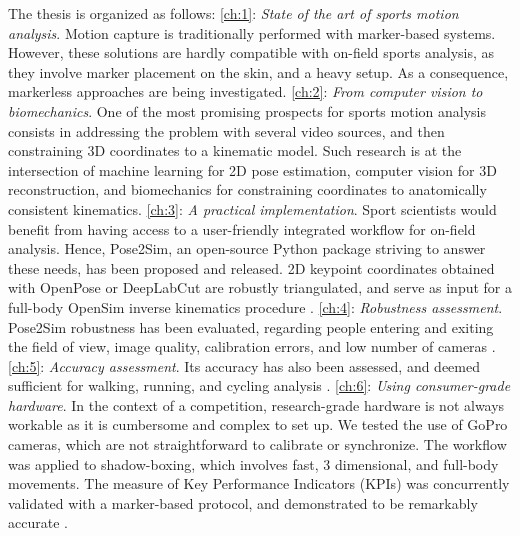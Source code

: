 The thesis is organized as follows:
\vskip 0.4cm
\noindent\autoref{ch:1}: \emph{State of the art of sports motion analysis}. \newline
Motion capture is traditionally performed with marker-based systems. However, these solutions are hardly compatible with on-field sports analysis, as they involve marker placement on the skin, and a heavy setup. As a consequence, markerless approaches are being investigated. 
\vskip 0.4cm
\noindent\autoref{ch:2}: \emph{From computer vision to biomechanics}. \newline
One of the most promising prospects for sports motion analysis consists in addressing the problem with several video sources, and then constraining 3D coordinates to a kinematic model. Such research is at the intersection of machine learning for 2D pose estimation, computer vision for 3D reconstruction, and biomechanics for constraining coordinates to anatomically consistent kinematics. 
\vskip 0.4cm
\noindent\autoref{ch:3}: \emph{A practical implementation}. \newline
Sport scientists would benefit from having access to a user-friendly integrated workflow for on-field analysis. Hence, Pose2Sim, an open-source Python package striving to answer these needs, has been proposed and released. 2D keypoint coordinates obtained with OpenPose or DeepLabCut are robustly triangulated, and serve as input for a full-body OpenSim inverse kinematics procedure \cite{Pagnon2022b}.
\vskip 0.4cm
\noindent\autoref{ch:4}: \emph{Robustness assessment}. \newline
Pose2Sim robustness has been evaluated, regarding people entering and exiting the field of view, image quality, calibration errors, and low number of cameras \cite{Pagnon2021}. 
\vskip 0.4cm
\noindent\autoref{ch:5}: \emph{Accuracy assessment}. \newline
Its accuracy has also been assessed, and deemed sufficient for walking, running, and cycling analysis \cite{Pagnon2022a}. 
\vskip 0.4cm
\noindent\autoref{ch:6}: \emph{Using consumer-grade hardware}. \newline
In the context of a competition, research-grade hardware is not always workable as it is cumbersome and complex to set up. We tested the use of GoPro cameras, which are not straightforward to calibrate or synchronize. The workflow was applied to shadow-boxing, which involves fast, 3 dimensional, and full-body movements. The measure of Key Performance Indicators (KPIs) was concurrently validated with a marker-based protocol, and demonstrated to be remarkably accurate \cite{Pagnon2022c}.
